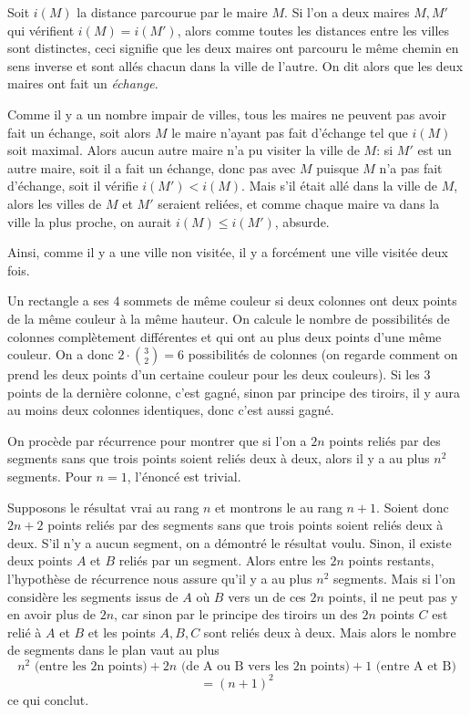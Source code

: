 \begin{sol}
Soit $i(M)$ la distance parcourue par le maire $M$. Si l'on a deux maires $M,M'$ qui vérifient $i(M)=i(M')$, alors comme toutes les distances entre les villes sont distinctes, ceci signifie que les deux maires ont parcouru le même chemin en sens inverse et sont allés chacun dans la ville de l'autre. On dit alors que les deux maires ont fait un \textit{échange}.

Comme il y a un nombre impair de villes, tous les maires ne peuvent pas avoir fait un échange, soit alors $M$ le maire n'ayant pas fait d'échange tel que $i(M)$ soit maximal. Alors aucun autre maire n'a pu visiter la ville de $M$: si $M'$ est un autre maire, soit il a fait un échange, donc pas avec $M$ puisque $M$ n'a pas fait d'échange, soit il vérifie $i(M')<i(M)$. Mais s'il était allé dans la ville de $M$, alors les villes de $M$ et $M'$ seraient reliées, et comme chaque maire va dans la ville la plus proche, on aurait $i(M)\le i(M')$, absurde.

Ainsi, comme il y a une ville non visitée, il y a forcément une ville visitée deux fois.
\end{sol}

\begin{sol}
Un rectangle a ses $4$ sommets de même couleur si deux colonnes ont deux points de la même couleur à la même hauteur. On calcule le nombre de possibilités de colonnes complètement différentes et qui ont au plus deux points d'une même couleur. On a donc $2 \cdot \binom{3}{2} = 6$ possibilités de colonnes (on regarde comment on prend les deux points d'un certaine couleur pour les deux couleurs). Si les $3$ points de la dernière colonne, c'est gagné, sinon par principe des tiroirs, il y aura au moins deux colonnes identiques, donc c'est aussi gagné.
\end{sol}

\begin{sol}
On procède par récurrence pour montrer que si l'on a $2n$ points reliés par des segments sans que trois points soient reliés deux à deux, alors il y a au plus $n^2$ segments. Pour $n=1$, l'énoncé est trivial.

Supposons le résultat vrai au rang $n$ et montrons le au rang $n+1$. Soient donc $2n+2$ points reliés par des segments sans que trois points soient reliés deux à deux. S'il n'y a aucun segment, on a démontré le résultat voulu. Sinon, il existe deux points $A$ et $B$ reliés par un segment. Alors entre les $2n$ points restants, l'hypothèse de récurrence nous assure qu'il y a au plus $n^2$ segments. Mais si l'on considère les segments issus de $A$ où $B$ vers un de ces $2n$ points, il ne peut pas y en avoir plus de $2n$, car sinon par le principe des tiroirs un des $2n$ points $C$ est relié à $A$ et $B$ et les points 
$A,B,C$ sont reliés deux à deux. Mais alors le nombre de segments dans le plan vaut au plus 
$$n^2\text{ (entre les 2n points)}+2n\text{ (de A ou B vers les 2n points)}+1\text{ (entre A et B)}$$
$$=(n+1)^2$$
ce qui conclut.
\end{sol}

